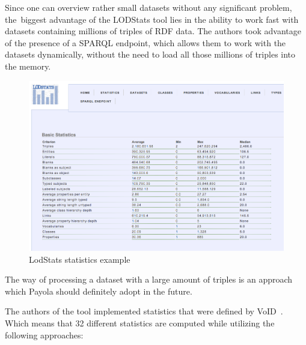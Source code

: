 Since one can overview rather small datasets without any significant problem, 
the~biggest advantage of the LODStats tool lies in the ability to work fast with 
datasets containing millions of triples of RDF data. The authors took advantage 
of the presence of a SPARQL endpoint, which allows them to work with the datasets 
dynamically, without the need to load all those millions of triples into the 
memory.


\begin{figure}
	\centering
	\includegraphics[width=140mm]{img/lodstats.png}
	\caption{LodStats statistics example}
	\label{fig:lodstats}
\end{figure}

The way of processing a dataset with a large amount of triples is an approach 
which Payola should definitely adopt in the future.

The authors of the tool implemented statistics that were defined by VoID~\cite{void}. Which 
means that 32 different statistics are computed while utilizing the following 
approaches:

